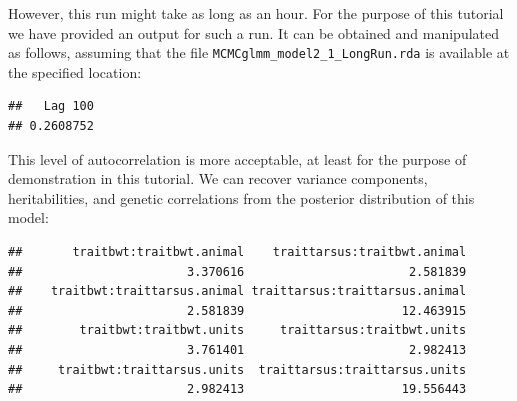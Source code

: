 \documentclass[
  12pt,
]{book}
\newenvironment{Shaded}{\begin{snugshade}}{\end{snugshade}}
\newcommand{\DataTypeTok}[1]{\textcolor[rgb]{0.13,0.29,0.53}{#1}}
\newcommand{\DecValTok}[1]{\textcolor[rgb]{0.00,0.00,0.81}{#1}}
\newcommand{\FloatTok}[1]{\textcolor[rgb]{0.00,0.00,0.81}{#1}}
\newcommand{\KeywordTok}[1]{\textcolor[rgb]{0.13,0.29,0.53}{\textbf{#1}}}
\newcommand{\NormalTok}[1]{#1}
\newcommand{\OperatorTok}[1]{\textcolor[rgb]{0.81,0.36,0.00}{\textbf{#1}}}
\newcommand{\StringTok}[1]{\textcolor[rgb]{0.31,0.60,0.02}{#1}}
\begin{document}
However, this run might take as long as an hour. For the purpose of this tutorial we have provided an output for such a run. It can be obtained and manipulated as follows, assuming that the file \texttt{MCMCglmm\_model2\_1\_LongRun.rda} is available at the specified location:

\begin{Shaded}
\end{Shaded}

\begin{verbatim}
##   Lag 100 
## 0.2608752
\end{verbatim}

This level of autocorrelation is more acceptable, at least for the purpose of demonstration in this tutorial.
We can recover variance components, heritabilities, and genetic correlations from the posterior distribution of this model:

\begin{Shaded}
\end{Shaded}

\begin{verbatim}
##       traitbwt:traitbwt.animal    traittarsus:traitbwt.animal 
##                       3.370616                       2.581839 
##    traitbwt:traittarsus.animal traittarsus:traittarsus.animal 
##                       2.581839                      12.463915 
##        traitbwt:traitbwt.units     traittarsus:traitbwt.units 
##                       3.761401                       2.982413 
##     traitbwt:traittarsus.units  traittarsus:traittarsus.units 
##                       2.982413                      19.556443
\end{verbatim}

\begin{Shaded}
\end{Shaded}
\end{document}
